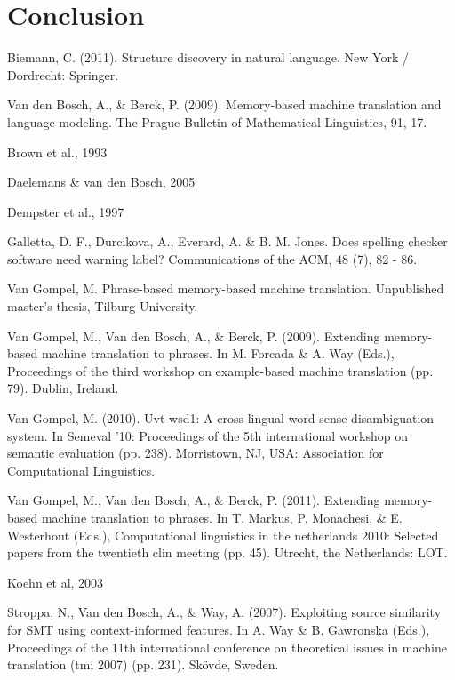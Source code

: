 \documentclass[12pt]{article}
\begin{document}
\section{Conclusion}

\begin{thebibliography}{99}

Biemann, C. (2011). Structure discovery in natural language. New York / Dordrecht: Springer.

Van den Bosch, A., \& Berck, P. (2009). Memory-based machine translation and language
modeling. The Prague Bulletin of Mathematical Linguistics, 91, 17.

Brown et al., 1993

Daelemans \& van den Bosch, 2005

Dempster et al., 1997

Galletta, D. F., Durcikova, A., Everard, A. \& B. M. Jones. Does spelling checker software need warning label? Communications of the ACM, 48 (7), 82 - 86.

Van Gompel, M. Phrase-based memory-based machine translation. Unpublished
master's thesis, Tilburg University.

Van Gompel, M., Van den Bosch, A., \& Berck, P. (2009). Extending memory-based
machine translation to phrases. In M. Forcada \& A. Way (Eds.), Proceedings of the
third workshop on example-based machine translation (pp. 79). Dublin, Ireland.

Van Gompel, M. (2010). Uvt-wsd1: A cross-lingual word sense disambiguation system.
In Semeval '10: Proceedings of the 5th international workshop on semantic evaluation
(pp. 238). Morristown, NJ, USA: Association for Computational Linguistics.

Van Gompel, M., Van den Bosch, A., \& Berck, P. (2011). Extending memory-based
machine translation to phrases. In T. Markus, P. Monachesi, \& E. Westerhout (Eds.),
Computational linguistics in the netherlands 2010: Selected papers from the twentieth
clin meeting (pp. 45). Utrecht, the Netherlands: LOT.

Koehn et al, 2003

Stroppa, N., Van den Bosch, A., \& Way, A. (2007). Exploiting source similarity for SMT
using context-informed features. In A. Way \& B. Gawronska (Eds.), Proceedings of the
11th international conference on theoretical issues in machine translation (tmi 2007)
(pp. 231). Skövde, Sweden.

\end{thebibliography}
\end{document}

